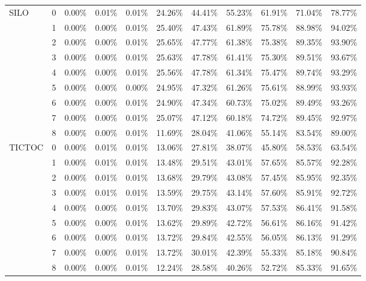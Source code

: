 \begin{tabular}{llrrrrrrrrr}
SILO & 0 & 0.00\% & 0.01\% & 0.01\% & 24.26\% & 44.41\% & 55.23\% & 61.91\% & 71.04\% & 78.77\% \\
       & 1 & 0.00\% & 0.00\% & 0.01\% & 25.40\% & 47.43\% & 61.89\% & 75.78\% & 88.98\% & 94.02\% \\
       & 2 & 0.00\% & 0.00\% & 0.01\% & 25.65\% & 47.77\% & 61.38\% & 75.38\% & 89.35\% & 93.90\% \\
       & 3 & 0.00\% & 0.00\% & 0.01\% & 25.63\% & 47.78\% & 61.41\% & 75.30\% & 89.51\% & 93.67\% \\
       & 4 & 0.00\% & 0.00\% & 0.01\% & 25.56\% & 47.78\% & 61.34\% & 75.47\% & 89.74\% & 93.29\% \\
       & 5 & 0.00\% & 0.00\% & 0.00\% & 24.95\% & 47.32\% & 61.26\% & 75.61\% & 88.99\% & 93.93\% \\
       & 6 & 0.00\% & 0.00\% & 0.01\% & 24.90\% & 47.34\% & 60.73\% & 75.02\% & 89.49\% & 93.26\% \\
       & 7 & 0.00\% & 0.00\% & 0.01\% & 25.07\% & 47.12\% & 60.18\% & 74.72\% & 89.45\% & 92.97\% \\
       & 8 & 0.00\% & 0.00\% & 0.01\% & 11.69\% & 28.04\% & 41.06\% & 55.14\% & 83.54\% & 89.00\% \\
TICTOC & 0 & 0.00\% & 0.01\% & 0.01\% & 13.06\% & 27.81\% & 38.07\% & 45.80\% & 58.53\% & 63.54\% \\
       & 1 & 0.00\% & 0.01\% & 0.01\% & 13.48\% & 29.51\% & 43.01\% & 57.65\% & 85.57\% & 92.28\% \\
       & 2 & 0.00\% & 0.01\% & 0.01\% & 13.68\% & 29.79\% & 43.08\% & 57.45\% & 85.95\% & 92.35\% \\
       & 3 & 0.00\% & 0.01\% & 0.01\% & 13.59\% & 29.75\% & 43.14\% & 57.60\% & 85.91\% & 92.72\% \\
       & 4 & 0.00\% & 0.00\% & 0.01\% & 13.70\% & 29.83\% & 43.07\% & 57.53\% & 86.41\% & 91.58\% \\
       & 5 & 0.00\% & 0.00\% & 0.01\% & 13.62\% & 29.89\% & 42.72\% & 56.61\% & 86.16\% & 91.42\% \\
       & 6 & 0.00\% & 0.00\% & 0.01\% & 13.72\% & 29.84\% & 42.55\% & 56.05\% & 86.13\% & 91.29\% \\
       & 7 & 0.00\% & 0.00\% & 0.01\% & 13.72\% & 30.01\% & 42.39\% & 55.33\% & 85.18\% & 90.84\% \\
       & 8 & 0.00\% & 0.00\% & 0.01\% & 12.24\% & 28.58\% & 40.26\% & 52.72\% & 85.33\% & 91.65\% \\
\bottomrule
\end{tabular}
